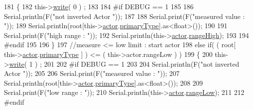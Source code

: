 \begin{DoxyCode}
181                     \{   
182                         this->\hyperlink{class_cool_board_actor_a958786ff01ea1056ee72c72d439f86da}{write}( 0 ) ; 
183 
184 \textcolor{preprocessor}{                    #if DEBUG == 1}
185                         
186                         Serial.println(F(\textcolor{stringliteral}{"not inverted Actor "}));
187 
188                         Serial.print(F(\textcolor{stringliteral}{"measured value : "}));
189                         Serial.println(root[this->\hyperlink{class_cool_board_actor_a8f190db9f7a39fddbcef7f152da970e9}{actor}.\hyperlink{struct_cool_board_actor_1_1state_a8a0b318fd2814cf67fe74ee8164df55e}{primaryType}].as<\textcolor{keywordtype}{float}>());
190 
191                         Serial.print(F(\textcolor{stringliteral}{"high range : "}));
192                         Serial.println(this->\hyperlink{class_cool_board_actor_a8f190db9f7a39fddbcef7f152da970e9}{actor}.\hyperlink{struct_cool_board_actor_1_1state_a6e5cd6c5cd44e2decfd8d4df1853f8e3}{rangeHigh});
193                     
194 \textcolor{preprocessor}{                    #endif}
195                     
196                     \}
197                     \textcolor{comment}{//measure <= low limit : start actor}
198                     \textcolor{keywordflow}{else} \textcolor{keywordflow}{if}( ( root[ this->\hyperlink{class_cool_board_actor_a8f190db9f7a39fddbcef7f152da970e9}{actor}.\hyperlink{struct_cool_board_actor_1_1state_a8a0b318fd2814cf67fe74ee8164df55e}{primaryType} ] ) <= ( this->actor.rangeLow 
      ) )
199                     \{
200                         this->\hyperlink{class_cool_board_actor_a958786ff01ea1056ee72c72d439f86da}{write}( 1 ) ;
201 
202 \textcolor{preprocessor}{                    #if DEBUG == 1}
203 
204                         Serial.println(F(\textcolor{stringliteral}{"not inverted Actor "}));
205 
206                         Serial.print(F(\textcolor{stringliteral}{"measured value : "}));
207                         Serial.println(root[this->\hyperlink{class_cool_board_actor_a8f190db9f7a39fddbcef7f152da970e9}{actor}.\hyperlink{struct_cool_board_actor_1_1state_a8a0b318fd2814cf67fe74ee8164df55e}{primaryType}].as<\textcolor{keywordtype}{float}>());
208 
209                         Serial.print(F(\textcolor{stringliteral}{"low range : "}));
210                         Serial.println(this->\hyperlink{class_cool_board_actor_a8f190db9f7a39fddbcef7f152da970e9}{actor}.\hyperlink{struct_cool_board_actor_1_1state_a43f891c9fb3bb63575c27cec860de55a}{rangeLow});
211                     
212 \textcolor{preprocessor}{                    #endif}

\end{DoxyCode}
